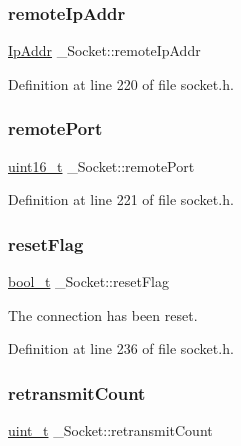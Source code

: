 \subsubsection{\texorpdfstring{remote\+Ip\+Addr}{remoteIpAddr}}
{\footnotesize\ttfamily \hyperlink{structIpAddr}{Ip\+Addr} \+\_\+\+Socket\+::remote\+Ip\+Addr}



Definition at line 220 of file socket.\+h.

\mbox{\label{struct__Socket_a942b99d94376540d6e25a591901e27b7}} 
\subsubsection{\texorpdfstring{remote\+Port}{remotePort}}
{\footnotesize\ttfamily \hyperlink{stdint_8h_a273cf69d639a59973b6019625df33e30}{uint16\+\_\+t} \+\_\+\+Socket\+::remote\+Port}



Definition at line 221 of file socket.\+h.

\mbox{\label{struct__Socket_a9efc804ce7a796e1974e7c28b7c704a7}} 
\subsubsection{\texorpdfstring{reset\+Flag}{resetFlag}}
{\footnotesize\ttfamily \hyperlink{compiler__port_8h_a812d16e5494522586b3784e55d479912}{bool\+\_\+t} \+\_\+\+Socket\+::reset\+Flag}



The connection has been reset. 



Definition at line 236 of file socket.\+h.

\mbox{\label{struct__Socket_a0bdf1bfdb2056693997c2ecbc4f054a2}} 
\subsubsection{\texorpdfstring{retransmit\+Count}{retransmitCount}}
{\footnotesize\ttfamily \hyperlink{compiler__port_8h_a12a1e9b3ce141648783a82445d02b58d}{uint\+\_\+t} \+\_\+\+Socket\+::retransmit\+Count}



